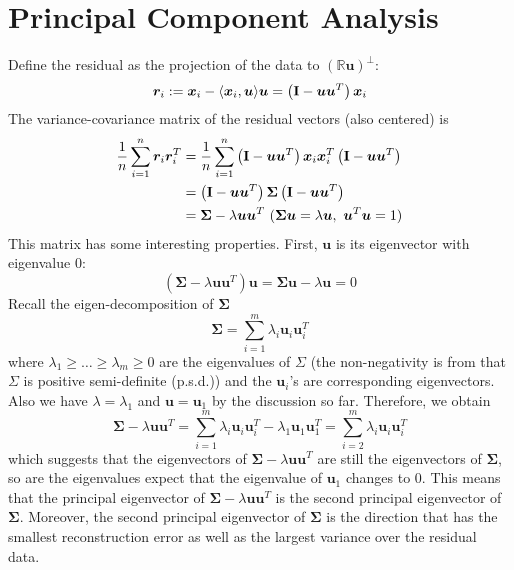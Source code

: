 \documentclass[../main.tex]{subfiles}
\begin{document}
\section{Principal Component Analysis}
Define the residual as the projection of the data to $(\mathbb{R}\bm{u})^{\bot}$:
\begin{equation*}
\bm{r}_i:=\bm{x}_i - \langle\bm{x}_i,\bm{u}  \rangle\bm{u} = \left({\bf I} - \bm{uu}^T \right)\bm{x}_i
\end{equation*}
The variance-covariance matrix of the residual vectors (also centered) is
\begin{align*}
\frac{1}{n}\sum_{i=1}^n \bm{r}_i\bm{r}_i^T &=  \frac{1}{n}\sum_{i=1}^n \left({\bf I} - \bm{uu}^T \right)\bm{x}_i\bm{x}_i^T\left({\bf I} - \bm{uu}^T \right)\\
&= \left({\bf I} - \bm{uu}^T \right)\bm{\Sigma}\left({\bf I} - \bm{uu}^T \right)\\
&=\bm{\Sigma} - \lambda\bm{uu}^T\ (\bm{\Sigma u}=\lambda \bm{u},\ \bm{u}^T\bm{u}=1)
\end{align*}
This matrix has some interesting properties. First, $\bm{u}$ is its eigenvector with eigenvalue $0$:
\begin{equation*}
\left(\bm{\Sigma} - \lambda\bm{uu}^T\right)\bm{u} = \bm{\Sigma u}-\lambda \bm{u}=0
\end{equation*}
Recall the eigen-decomposition of $\bm{\Sigma}$
\begin{equation}\label{eq_2_edom}
\bm{\Sigma} = \sum_{i=1}^m \lambda_i\bm{u}_i\bm{u}_i^T
\end{equation}
where $\lambda_1\geq\dots\geq\lambda_m\geq 0$ are the eigenvalues of $\Sigma$ (the non-negativity is from that $\Sigma$ is positive semi-definite (p.s.d.)) and the $\bm{u}_i$'s are corresponding eigenvectors. Also we have $\lambda = \lambda_1$ and $\bm{u}=\bm{u}_1$ by the discussion so far. Therefore, we obtain
\begin{equation*}
\bm{\Sigma} - \lambda\bm{uu}^T = \sum_{i=1}^m \lambda_i\bm{u}_i\bm{u}_i^T - \lambda_1\bm{u}_1\bm{u}_1^T = \sum_{i=2}^m \lambda_i\bm{u}_i\bm{u}_i^T
\end{equation*}
which suggests that the eigenvectors of $\bm{\Sigma} - \lambda\bm{uu}^T$ are still the eigenvectors of $\bm{\Sigma}$, so are the eigenvalues expect that the eigenvalue of $\bm{u}_1$ changes to $0$. This means that the principal eigenvector of $\bm{\Sigma} - \lambda\bm{uu}^T$ is the second principal eigenvector of $\bm{\Sigma}$. Moreover, the second principal eigenvector of $\bm{\Sigma}$ is the direction that has the smallest reconstruction error as well as the largest variance over the residual data.
\end{document}
